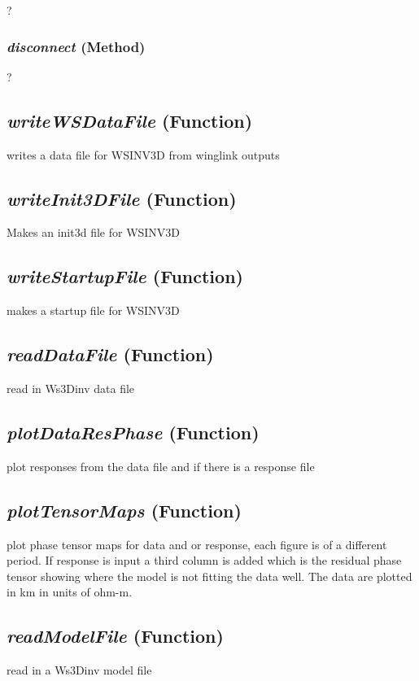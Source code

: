 ?

\subsubsection{\textit{disconnect} (Method)}
\label{sssec:modeling.ws3dtools.ListPeriods.disconnect}

?


\subsection{\textit{writeWSDataFile} (Function)}
\label{ssec:modeling.ws3dtools.writeWSDataFile}

writes a data file for WSINV3D from winglink outputs

\subsection{\textit{writeInit3DFile} (Function)}
\label{ssec:modeling.ws3dtools.writeInit3DFile}

Makes an init3d file for WSINV3D

\subsection{\textit{writeStartupFile} (Function)}
\label{ssec:modeling.ws3dtools.writeStartupFile}

makes a startup file for WSINV3D

\subsection{\textit{readDataFile} (Function)}
\label{ssec:modeling.ws3dtools.readDataFile}

read in Ws3Dinv data file


\subsection{\textit{plotDataResPhase} (Function)}
\label{ssec:modeling.ws3dtools.plotDataResPhase}

plot responses from the data file and if there is a response file

\subsection{\textit{plotTensorMaps} (Function)}
\label{ssec:modeling.ws3dtools.plotTensorMaps}

plot phase tensor maps for data and or response, each figure is of a
    different period.  If response is input a third column is added which is 
    the residual phase tensor showing where the model is not fitting the data 
    well.  The data are plotted in km in units of ohm-m.

\subsection{\textit{readModelFile} (Function)}
\label{ssec:modeling.ws3dtools.readModelFile}

read in a Ws3Dinv model file

